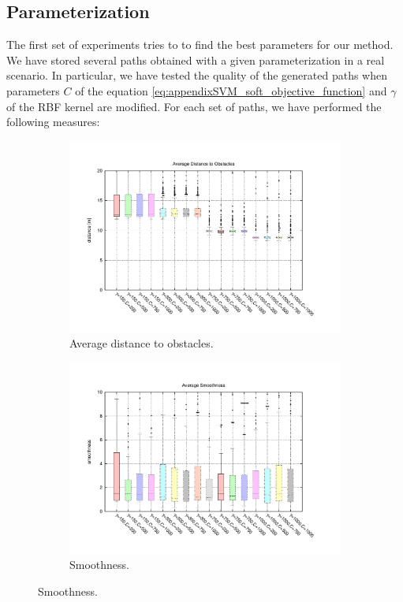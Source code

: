 \subsection{Parameterization}\label{ch:chapter06_02_01}

The first set of experiments tries to to find the best parameters for our method. We have stored several paths obtained with a given parameterization in a real scenario. In particular, we have tested the quality of the generated paths when parameters $C$ of the equation \ref{eq:appendixSVM_soft_objective_function} and $\gamma$ of the \ac{RBF} kernel are modified. For each set of paths, we have performed the following measures:

\begin{figure}[h!]
  \centering
  \begin{subfigure}[b]{\textwidth}
	  \centering
	  \includegraphics[width=\textwidth, trim=55 50 85 60,clip]{figure8}
	  \caption{Average distance to obstacles.}
	  \label{fig:cp06_avg_dist_msvmpp}
  \end{subfigure}  

  \begin{subfigure}[b]{\textwidth}
	  \centering
	  \includegraphics[width=\textwidth, trim=55 50 85 60,clip]{figure9}
	  \caption{Smoothness.}
	  \label{fig:cp06_smoothness_msvmpp}
  \end{subfigure}        
\end{figure}

